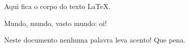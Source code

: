 \documentclass[12pt,a4paper]{memoir}
\begin{document}
Aqui fica o corpo do texto \LaTeX.

Mundo, mundo, vasto mundo: oi!

Neste documento nenhuma palavra leva acento! Que pena.
\end{document}

